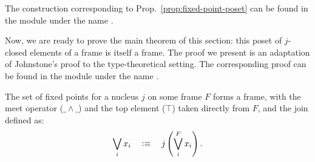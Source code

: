 The \veragda{} construction corresponding to Prop.~\ref{prop:fixed-point-poset} can be
found in the  module under the name .

Now, we are ready to prove the main theorem of this section: this poset of $j$-closed
elements of a frame is itself a frame. The proof we present is an adaptation of
Johnstone's proof \cite[II.2.2, pg.~49]{stone-spaces} to the type-theoretical setting. The
corresponding \veragda{} proof can be found in the  module under the name
.

\begin{thm}\label{thm:fixed-point-frame}
  The set of fixed points for a nucleus $j$ on some frame $F$ forms a frame, with the meet
  operator ($\_\wedge\_$) and the top element ($\top$) taken directly from $F$, and the join
  defined as:
  \begin{equation*}
    \bigvee_i x_i \quad\vcentcolon\equiv\quad j \left( \bigvee^F_i x_i \right).
  \end{equation*}
\end{thm}

